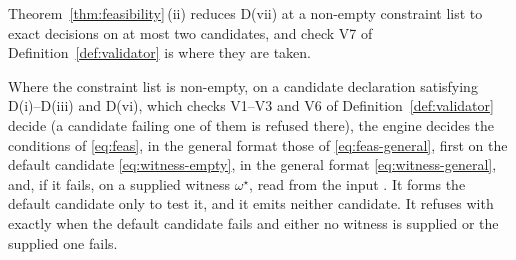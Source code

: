
Theorem~\ref{thm:feasibility}\,(ii) reduces D(vii) at a non-empty constraint list to
exact decisions on at most two candidates, and check V7 of
Definition~\ref{def:validator} is where they are taken.

\begin{requirement}\label{req:feasibility-witness}
Where the constraint list is non-empty, on a candidate declaration
satisfying D(i)--D(iii) and D(vi), which checks V1--V3 and V6 of
Definition~\ref{def:validator} decide (a candidate failing one of them is
refused there), the engine decides the
conditions of
\eqref{eq:feas}, in the general format those of \eqref{eq:feas-general},
first on the default candidate \eqref{eq:witness-empty}, in the general format
\eqref{eq:witness-general}, and, if it fails, on a
supplied witness $\omega^{\star}$, read from the input
. It forms the default candidate only to test it,
and it emits neither candidate. It refuses with 
exactly when the default candidate fails and either no witness is supplied or
the supplied one fails.
\end{requirement}
